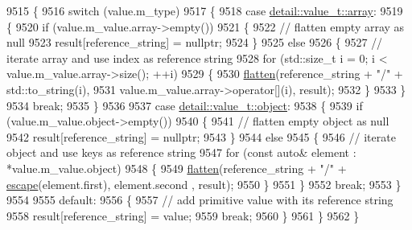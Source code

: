 \begin{DoxyCode}
9515     \{
9516         \textcolor{keywordflow}{switch} (value.m\_type)
9517         \{
9518             \textcolor{keywordflow}{case} \hyperlink{namespacenlohmann_1_1detail_a1ed8fc6239da25abcaf681d30ace4985af1f713c9e000f5d3f280adbd124df4f5}{detail::value\_t::array}:
9519             \{
9520                 \textcolor{keywordflow}{if} (value.m\_value.array->empty())
9521                 \{
9522                     \textcolor{comment}{// flatten empty array as null}
9523                     result[reference\_string] = \textcolor{keyword}{nullptr};
9524                 \}
9525                 \textcolor{keywordflow}{else}
9526                 \{
9527                     \textcolor{comment}{// iterate array and use index as reference string}
9528                     \textcolor{keywordflow}{for} (std::size\_t i = 0; i < value.m\_value.array->size(); ++i)
9529                     \{
9530                         \hyperlink{classnlohmann_1_1json__pointer_ab0d7759d0caa6a0c0187916da28e6ee7}{flatten}(reference\_string + \textcolor{stringliteral}{"/"} + std::to\_string(i),
9531                                 value.m\_value.array->operator[](i), result);
9532                     \}
9533                 \}
9534                 \textcolor{keywordflow}{break};
9535             \}
9536 
9537             \textcolor{keywordflow}{case} \hyperlink{namespacenlohmann_1_1detail_a1ed8fc6239da25abcaf681d30ace4985aa8cfde6331bd59eb2ac96f8911c4b666}{detail::value\_t::object}:
9538             \{
9539                 \textcolor{keywordflow}{if} (value.m\_value.object->empty())
9540                 \{
9541                     \textcolor{comment}{// flatten empty object as null}
9542                     result[reference\_string] = \textcolor{keyword}{nullptr};
9543                 \}
9544                 \textcolor{keywordflow}{else}
9545                 \{
9546                     \textcolor{comment}{// iterate object and use keys as reference string}
9547                     \textcolor{keywordflow}{for} (\textcolor{keyword}{const} \textcolor{keyword}{auto}& element : *value.m\_value.object)
9548                     \{
9549                         \hyperlink{classnlohmann_1_1json__pointer_ab0d7759d0caa6a0c0187916da28e6ee7}{flatten}(reference\_string + \textcolor{stringliteral}{"/"} + \hyperlink{classnlohmann_1_1json__pointer_a8abf3577f9a0087f29a233893cdc73ad}{escape}(element.first), element.second
      , result);
9550                     \}
9551                 \}
9552                 \textcolor{keywordflow}{break};
9553             \}
9554 
9555             \textcolor{keywordflow}{default}:
9556             \{
9557                 \textcolor{comment}{// add primitive value with its reference string}
9558                 result[reference\_string] = value;
9559                 \textcolor{keywordflow}{break};
9560             \}
9561         \}
9562     \}
\end{DoxyCode}
